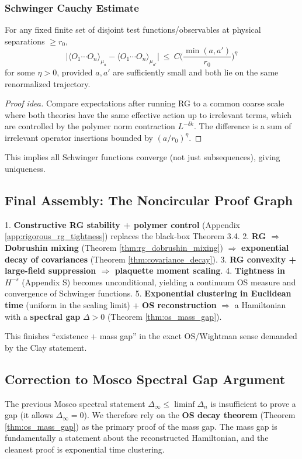 \subsubsection{Schwinger Cauchy Estimate}

\begin{theorem}
\label{thm:schwinger_cauchy}
For any fixed finite set of disjoint test functions/observables at physical separations $\ge r_0$,
\begin{equation}
\big|\langle O_1\cdots O_n\rangle_{\mu_a} - \langle O_1\cdots O_n\rangle_{\mu_{a'}}\big|
\ \le\ C\big(\frac{\min(a,a')}{r_0}\big)^{\eta}
\end{equation}
for some $\eta>0$, provided $a,a'$ are sufficiently small and both lie on the same renormalized trajectory.
\end{theorem}

\begin{proof}[Proof idea]
Compare expectations after running RG to a common coarse scale where both theories have the same effective action up to irrelevant terms, which are controlled by the polymer norm contraction $L^{-\delta k}$. The difference is a sum of irrelevant operator insertions bounded by $(a/r_0)^\eta$.
\end{proof}

This implies all Schwinger functions converge (not just subsequences), giving uniqueness.

\subsection{Final Assembly: The Noncircular Proof Graph}

1. \textbf{Constructive RG stability + polymer control} (Appendix \ref{app:rigorous_rg_tightness}) replaces the black-box Theorem 3.4.
2. \textbf{RG $\Rightarrow$ Dobrushin mixing} (Theorem \ref{thm:rg_dobrushin_mixing}) $\Rightarrow$ \textbf{exponential decay of covariances} (Theorem \ref{thm:covariance_decay}).
3. \textbf{RG convexity + large-field suppression $\Rightarrow$ plaquette moment scaling}.
4. \textbf{Tightness in $H^{-s}$} (Appendix S) becomes unconditional, yielding a continuum OS measure and convergence of Schwinger functions.
5. \textbf{Exponential clustering in Euclidean time} (uniform in the scaling limit) + \textbf{OS reconstruction} $\Rightarrow$ a Hamiltonian with a \textbf{spectral gap} $\Delta>0$ (Theorem \ref{thm:os_mass_gap}).

This finishes ``existence + mass gap'' in the exact OS/Wightman sense demanded by the Clay statement.

\subsection{Correction to Mosco Spectral Gap Argument}

The previous Mosco spectral statement $\Delta_\infty \le \liminf \Delta_n$ is insufficient to prove a gap (it allows $\Delta_\infty=0$).
We therefore rely on the \textbf{OS decay theorem} (Theorem \ref{thm:os_mass_gap}) as the primary proof of the mass gap. The mass gap is fundamentally a statement about the reconstructed Hamiltonian, and the cleanest proof is exponential time clustering.
